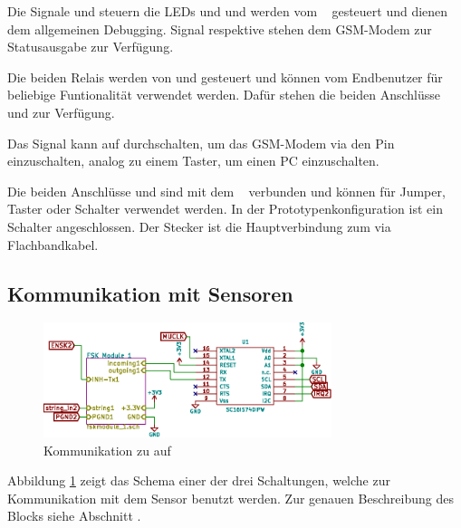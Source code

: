 Die  Signale    und   steuern  die  LEDs    und
  und  werden  vom  \Raspi~  gesteuert  und  dienen  dem  allgemeinen
Debugging. Signal    respektive    stehen  dem
GSM-Modem zur Statusausgabe zur Verf\"ugung.

Die   beiden  Relais   werden  von     und     gesteuert
und  k\"onnen  vom  Endbenutzer   f\"ur  beliebige  Funtionalit\"at  verwendet
werden. Daf\"ur stehen  die beiden  Anschl\"usse  und   zur
Verf\"ugung.

Das Signal  kann auf  durchschalten, um das GSM-Modem
via den Pin   einzuschalten, analog zu einem  Taster, um einen
PC einzuschalten.

Die  beiden  Anschl\"usse    und   sind  mit  dem  \Raspi~
verbunden und k\"onnen f\"ur Jumper, Taster oder Schalter verwendet werden. In
der  Prototypenkonfiguration  ist   ein  Schalter  angeschlossen. Der  Stecker
 ist die Hauptverbindung zum \Raspi via Flachbandkabel.


\subsection{Kommunikation mit Sensoren}
\label{subsec:hw:master:sensorcomm}


\begin{figure}[h!t]
    \centering
    \includegraphics[width=0.75\textwidth]{images/superv-sch/supervisor--sch--comms.eps}
    \caption{Kommunikation zu \Sensor auf \Master}
    \label{fig:sch:master:comms}
\end{figure}

Abbildung  \ref{fig:sch:master:comms}   zeigt  das   Schema  einer   der  drei
Schaltungen,  welche  zur Kommunikation  mit  dem  Sensor benutzt  werden. Zur
genauen  Beschreibung  des   Blocks    siehe  Abschnitt
.

